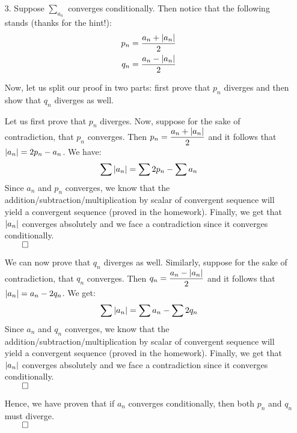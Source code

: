 \documentclass[11pt]{article}
\DeclarePairedDelimiter\abs{\lvert}{\rvert}%
\begin{document}
\begin{itemize}
        \newpage
        \item[3.]
            Suppose $\sum_{a_n}$ converges conditionally. Then notice that the
            following stands (thanks for the hint!):
            \begin{align}
                p_n &= \dfrac{a_n + \abs{a_n}}{2}\\
                q_n &= \dfrac{a_n - \abs{a_n}}{2}
            \end{align}

            Now, let us split our proof in two parts: first prove that $p_n$
            diverges and then show that $q_n$ diverges as well.

            Let us first prove that $p_n$ diverges. Now, suppose for the sake
            of contradiction, that $p_n$ converges. Then $p_n = \dfrac{a_n +
            \abs{a_n}}{2}$ and it follows that $\abs{a_n} = 2p_n - a_n$. We
            have:
            \begin{align*}
                \sum{\abs{a_n}} = \sum{2p_n} - \sum{a_n}
            \end{align*}
            Since $a_n$ and $p_n$ converges, we know that the
            addition/subtraction/multiplication by scalar of convergent
            sequence will yield a convergent sequence (proved in the homework).
            Finally, we get that $\abs{a_n}$ converges absolutely and we face a
            contradiction since it converges conditionally.\\
            $\qed$

            We can now prove that $q_n$ diverges as well. Similarly, suppose
            for the sake of contradiction, that $q_n$ converges. Then $q_n =
            \dfrac{a_n - \abs{a_n}}{2}$ and it follows that $\abs{a_n} = a_n -
            2q_n$. We get:
            \begin{align*}
                \sum{\abs{a_n}} = \sum{a_n} - \sum{2q_n}
            \end{align*}
            Since $a_n$ and $q_n$ converges, we know that the
            addition/subtraction/multiplication by scalar of convergent
            sequence will yield a convergent sequence (proved in the homework).
            Finally, we get that $\abs{a_n}$ converges absolutely and we face a
            contradiction since it converges conditionally.\\
            $\qed$

            Hence, we have proven that if $a_n$ converges conditionally, then
            both $p_n$ and $q_n$ must diverge.\\
            $\qed$


\end{itemize}
\end{document}
